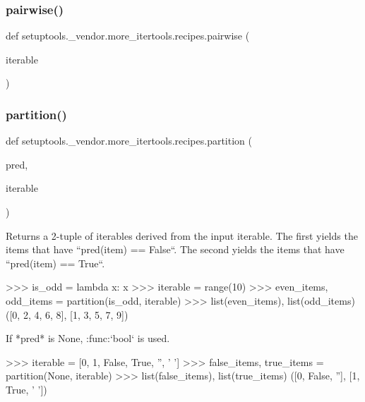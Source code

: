 \subsubsection{\texorpdfstring{pairwise()}{pairwise()}}
{\footnotesize\ttfamily def setuptools.\+\_\+vendor.\+more\+\_\+itertools.\+recipes.\+pairwise (\begin{DoxyParamCaption}\item[{}]{iterable }\end{DoxyParamCaption})}

\mbox{\label{namespacesetuptools_1_1__vendor_1_1more__itertools_1_1recipes_ab7db4ae0d779310052eb81556166fbe1}} 
\subsubsection{\texorpdfstring{partition()}{partition()}}
{\footnotesize\ttfamily def setuptools.\+\_\+vendor.\+more\+\_\+itertools.\+recipes.\+partition (\begin{DoxyParamCaption}\item[{}]{pred,  }\item[{}]{iterable }\end{DoxyParamCaption})}

\begin{DoxyVerb}Returns a 2-tuple of iterables derived from the input iterable.
The first yields the items that have ``pred(item) == False``.
The second yields the items that have ``pred(item) == True``.

    >>> is_odd = lambda x: x %
    >>> iterable = range(10)
    >>> even_items, odd_items = partition(is_odd, iterable)
    >>> list(even_items), list(odd_items)
    ([0, 2, 4, 6, 8], [1, 3, 5, 7, 9])

If *pred* is None, :func:`bool` is used.

    >>> iterable = [0, 1, False, True, '', ' ']
    >>> false_items, true_items = partition(None, iterable)
    >>> list(false_items), list(true_items)
    ([0, False, ''], [1, True, ' '])\end{DoxyVerb}
 \mbox{\label{namespacesetuptools_1_1__vendor_1_1more__itertools_1_1recipes_a3e0a127ba8d18f436377208d4659a2d0}} 
